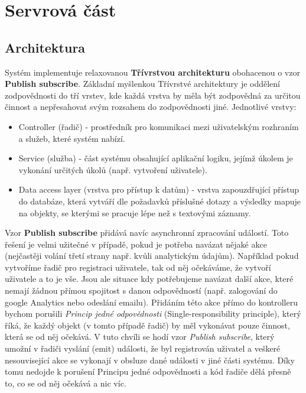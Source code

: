 
\section{Servrová část}

\subsection{Architektura}
Systém implementuje relaxovanou \textbf{Třívrstvou architekturu} obohacenou o vzor \textbf{Publish subscribe}. Základní myšlenkou Třívrstvé architektury je oddělení zodpovědnosti do tří vrstev, kde každá vrstva by měla být zodpovědná za určitou činnost a nepřesahovat svým rozsahem do zodpovědnosti jiné. Jednotlivé vrstvy:
\begin{itemize}
    \item Controller (řadič) - prostředník pro komunikaci mezi uživatelským rozhraním a služeb, které systém nabízí.
    \item Service (služba) - část systému obsahující aplikační logiku, jejímž úkolem je vykonání určitých úkolů (např. vytvoření uživatele).
    \item Data access layer (vrstva pro přístup k datům) - vrstva zapouzdřující přístup do databáze, která vytváří dle požadavků příslušné dotazy a výsledky mapuje na objekty, se kterými se pracuje lépe než s textovými záznamy.
\end{itemize}

Vzor \textbf{Publish subscribe} přidává navíc asynchronní zpracování událostí. Toto řešení je velmi užitečné v případě, pokud je potřeba navázat nějaké akce (nejčastěji volání třetí strany např. kvůli analytickým údajům). Například pokud vytvoříme řadič pro registraci uživatele, tak od něj očekáváme, že vytvoří uživatele a to je vše. Jsou ale situace kdy potřebujeme navázat další akce, které nemají žádnou přímou spojitost s danou odpovědností (např. zalogování do google Analytics nebo odeslání emailu). Přidáním této akce přímo do kontrolleru bychom porušili \textit{Princip jedné odpovědnosti} (Single-responsibility principle), který říká, že každý objekt (v tomto případě řadič) by měl vykonávat pouze činnost, která se od něj očekává. V tuto chvíli se hodí vzor \textit{Publish subscribe}, který umožní v řadiči vyslání (emit) události, že byl registrován uživatel a veškeré nesouvisející akce se vykonají v obsluze dané události v jiné části systému. Díky tomu nedojde k porušení Principu jedné odpovědnosti a kód řadiče dělá přesně to, co se od něj očekává a nic víc.

